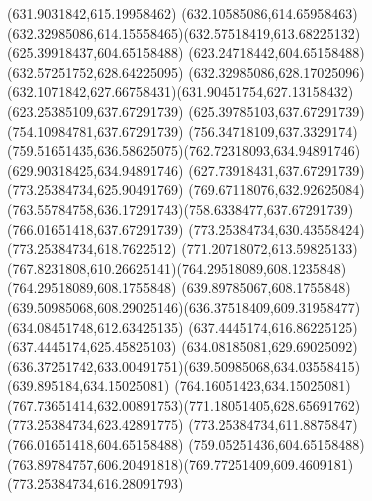 {{	\closepath
	\moveto(631.9031842,615.19958462)
	\curveto(632.10585086,614.65958463)(632.32985086,614.15558465)(632.57518419,613.68225132)
	\lineto(625.39918437,604.65158488)
	\lineto(623.24718442,604.65158488)
	\closepath
	\moveto(632.57251752,628.64225095)
	\curveto(632.32985086,628.17025096)(632.1071842,627.66758431)(631.90451754,627.13158432)
	\lineto(623.25385109,637.67291739)
	\lineto(625.39785103,637.67291739)
	\closepath
	\moveto(754.10984781,637.67291739)
	\curveto(756.34718109,637.3329174)(759.51651435,636.58625075)(762.72318093,634.94891746)
	\lineto(629.90318425,634.94891746)
	\lineto(627.73918431,637.67291739)
	\closepath
	\moveto(773.25384734,625.90491769)
	\curveto(769.67118076,632.92625084)(763.55784758,636.17291743)(758.6338477,637.67291739)
	\lineto(766.01651418,637.67291739)
	\lineto(773.25384734,630.43558424)
	\closepath
	\moveto(773.25384734,618.7622512)
	\curveto(771.20718072,613.59825133)(767.8231808,610.26625141)(764.29518089,608.1235848)
	\lineto(764.29518089,608.1755848)
	\lineto(639.89785067,608.1755848)
	\curveto(639.50985068,608.29025146)(636.37518409,609.31958477)(634.08451748,612.63425135)
	\lineto(637.4445174,616.86225125)
	\lineto(637.4445174,625.45825103)
	\lineto(634.08185081,629.69025092)
	\curveto(636.37251742,633.00491751)(639.50985068,634.03558415)(639.895184,634.15025081)
	\lineto(764.16051423,634.15025081)
	\curveto(767.73651414,632.00891753)(771.18051405,628.65691762)(773.25384734,623.42891775)
	\closepath
	\moveto(773.25384734,611.8875847)
	\lineto(766.01651418,604.65158488)
	\lineto(759.05251436,604.65158488)
	\curveto(763.89784757,606.20491818)(769.77251409,609.4609181)(773.25384734,616.28091793)
	\closepath
}
}
{
}
